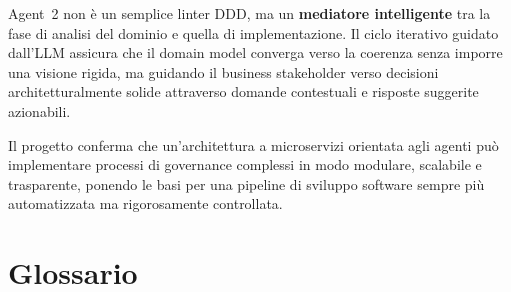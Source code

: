 \documentclass[12pt,a4paper]{report}
\begin{document}
\begin{tcolorbox}[enhanced, colback=lightgray, colframe=boxheader,
  title=\textbf{Sintesi del Valore Aggiunto}, fonttitle=\small\bfseries,
  colbacktitle=boxheader, coltitle=white]
Agent~2 non è un semplice linter DDD, ma un \textbf{mediatore intelligente}
tra la fase di analisi del dominio e quella di implementazione.
Il ciclo iterativo guidato dall'LLM assicura che il domain model
converga verso la coerenza senza imporre una visione rigida,
ma guidando il business stakeholder verso decisioni architetturalmente
solide attraverso domande contestuali e risposte suggerite azionabili.
\end{tcolorbox}

Il progetto conferma che un'architettura a microservizi orientata agli
agenti può implementare processi di governance complessi in modo modulare,
scalabile e trasparente, ponendo le basi per una pipeline di sviluppo
software sempre più automatizzata ma rigorosamente controllata.

\chapter*{Glossario}
\end{document}
